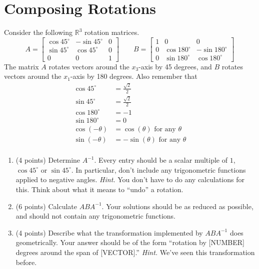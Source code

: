 \documentclass{article}
\theoremstyle{remark}
\begin{document}
\section{Composing Rotations}
Consider the following $\mathbb R^3$ rotation matrices.
\begin{displaymath}
  A =
  \begin{bmatrix}
    \cos 45^\circ & -\sin 45^\circ & 0 \\
    \sin 45^\circ & \cos 45^\circ & 0 \\
    0 & 0 & 1
  \end{bmatrix}
  \qquad
  B =
  \begin{bmatrix}
    1 & 0 & 0 \\
    0 & \cos 180^\circ & -\sin 180^\circ \\
    0 & \sin 180^\circ & \cos 180^\circ
  \end{bmatrix}
\end{displaymath}
The matrix $A$ rotates vectors around the $x_3$-axis by 45 degrees, and $B$ rotates vectors around the $x_1$-axis by 180 degrees.
Also remember that
\begin{align*}
  \cos 45^\circ &= \frac{\sqrt{2}}{2} \\
  \sin 45^\circ &= \frac{\sqrt{2}}{2} \\
  \cos 180^\circ &= -1 \\
  \sin 180^\circ &= 0 \\
  \cos(-\theta) &= \cos(\theta) \text{ for any $\theta$} \\
  \sin(-\theta) &= -\sin(\theta) \text{ for any $\theta$} \\
\end{align*}
\begin{enumerate}
\item (4 points) Determine $A^{-1}$.
  Every entry should be a scalar multiple of $1$, $\cos 45^\circ$ or $\sin 45^{\circ}$.
  In particular, don't include any trigonometric functions applied to negative angles.
  \textit{Hint.} You don't have to do any calculations for this.
  Think about what it means to ``undo'' a rotation.
\item (6 points) Calculate $ABA^{-1}$.
  Your solutions should be as reduced as possible, and should not contain any trigonometric functions.
\item (4 points) Describe what the transformation implemented by $ABA^{-1}$ does geometrically. Your answer should be of the form ``rotation by [NUMBER] degrees around the span of [VECTOR].'' \textit{Hint.} We've seen this transformation before.
\end{enumerate}
\end{document}
